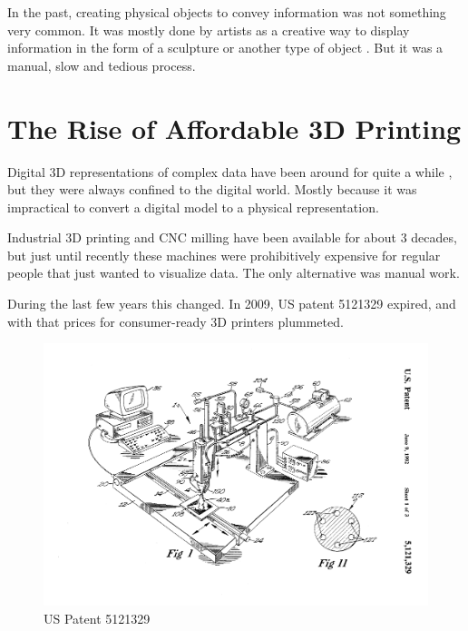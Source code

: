 In the past, creating physical objects to convey information was not something
very common. It was mostly done by artists as a creative way to display
information in the form of a sculpture or another type of object
\cite{day:2009}\cite{schenker:2012}. But it was a manual, slow and tedious
process.


\section{The Rise of Affordable 3D Printing}\label{sec:history-3dprinting}

Digital 3D representations of complex data have been around for quite a while
\cite{marcus:2003}, but they were always confined to the digital world.  Mostly
because it was impractical to convert a digital model to a physical
representation.

Industrial 3D printing and CNC milling have been available for about 3 decades,
but just until recently these machines were prohibitively expensive for regular
people that just wanted to visualize data. The only alternative was manual work.


During the last few years this changed. In 2009, US patent 5121329
\cite{us5121329:1992} expired, and with that prices for consumer-ready 3D
printers plummeted.

\begin{figure}[h]
	\centering
	\includegraphics[width=\textwidth]{images/US5121329-1.png}
	\caption{US Patent 5121329}
	\label{img:us5121329a}
\end{figure}

